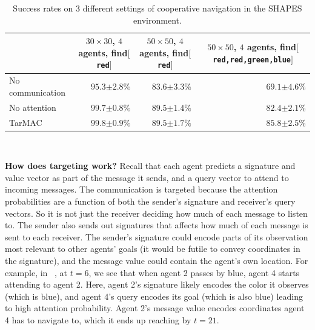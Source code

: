 \begin{table}[h!]
\centering
\begin{tabular}{lrrr}
   & \multicolumn{1}{c}{{\scriptsize $30 \times 30$, $4$ agents, find$[$\texttt{red}$]$}} & \multicolumn{1}{c}{{\scriptsize $50 \times 50$, $4$ agents, find$[$\texttt{red}$]$}} & \multicolumn{1}{c}{{\scriptsize $50 \times 50$, $4$ agents, find$[$\texttt{red,red,green,blue}$]$}}    \\ \midrule
    {\small No communication}
        & {\small $95.3$}{\scriptsize $\pm 2.8\%$} & {\small $83.6$}{\scriptsize $\pm 3.3\%$} & {\small $69.1$}{\scriptsize $\pm 4.6\%$}  \\[0.05in]
    {\small No attention}
        & {\small $\mathbf{99.7}$}{\scriptsize $\pm 0.8\%$} & {\small $\mathbf{89.5}$}{\scriptsize $\pm 1.4\%$} & {\small $82.4$}{\scriptsize $\pm 2.1\%$} \\[0.05in]
    {\small TarMAC}
        & {\small $\mathbf{99.8}$}{\scriptsize $\pm 0.9\%$} & {\small $\mathbf{89.5}$}{\scriptsize $\pm 1.7\%$} & {\small $\mathbf{85.8}$}{\scriptsize $\pm 2.5\%$}  \\ \bottomrule
\end{tabular} \\[0.05in]
\caption{Success rates on $3$ different settings of cooperative navigation
    in the SHAPES environment.}
\label{table:shapesnumbers}
\vspace{-15pt}
\end{table}

\textbf{How does targeting work?}
Recall that each agent predicts a signature and value vector as part of the message
it sends, and a query vector to attend to incoming messages.
The communication is targeted because the attention probabilities are a function
of both the sender's signature and receiver's query vectors. So it is not just
the receiver deciding how much of each message to listen to.
The sender also sends out signatures that affects how much of each
message is sent to each receiver.
The sender's signature could encode parts of its observation most relevant to other
agents' goals (\eg it would be futile to convey coordinates in the signature),
and the message value could contain the agent's own location. For example, in ~,
at $t=6$, we see that when agent 2 passes by blue, agent 4 starts attending to agent 2. Here,
agent 2's signature likely encodes the color it observes (which is blue), and agent 4's query
encodes its goal (which is also blue) leading to high attention probability.
Agent 2's message value encodes coordinates agent 4 has to navigate to,
which it ends up reaching by $t=21$.

